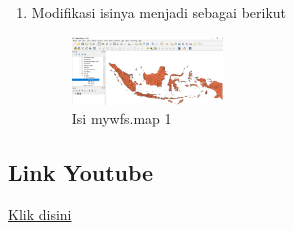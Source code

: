 \begin{enumerate}
  \item Modifikasi isinya menjadi sebagai berikut
  \hfill\break
    \begin{figure}[H]
		\includegraphics[width=4cm]{figures/1174015/4/No14.png}
		\centering
		\caption{Isi mywfs.map 1}
    \end{figure}

 
\end{enumerate}
\subsection{Link Youtube}
\href{https://youtu.be/TnPKz8Z2bj4}{Klik disini}